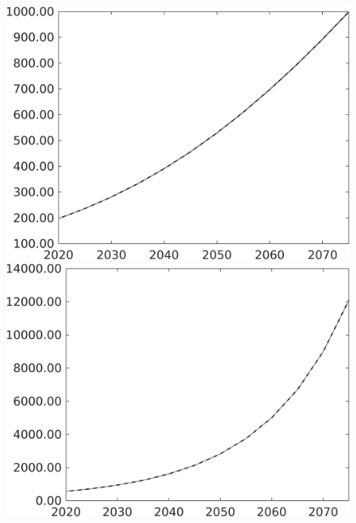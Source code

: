 \documentclass[12pt]{article}
\begin{document}
\begin{figure}[h!!]
\begin{minipage}[]{0.32\textwidth}
	\end{minipage}	
	\begin{minipage}[]{0.32\textwidth}
		\includegraphics[width=1\textwidth]{../../codding_model/own_basedOnFried/optimalPol_010922_revision/figures/all_13Sept22/PerdifNoTauf_Equlab_regime0_CompTaul_G_spillover0_nsk0_xgr1_knspil1_sep1_LFlimit0_emsbase0_countec0_GovRev0_etaa0.79_lgd0.png}
	\end{minipage}	
\begin{minipage}[]{0.32\textwidth}
\includegraphics[width=1\textwidth]{../../codding_model/own_basedOnFried/optimalPol_010922_revision/figures/all_13Sept22/PerdifNoTauf_Equlab_regime0_CompTaul_GFF_spillover0_nsk0_xgr1_knspil1_sep1_LFlimit0_emsbase0_countec0_GovRev0_etaa0.79_lgd0.png}

\end{minipage}
\end{figure}
\end{document}
